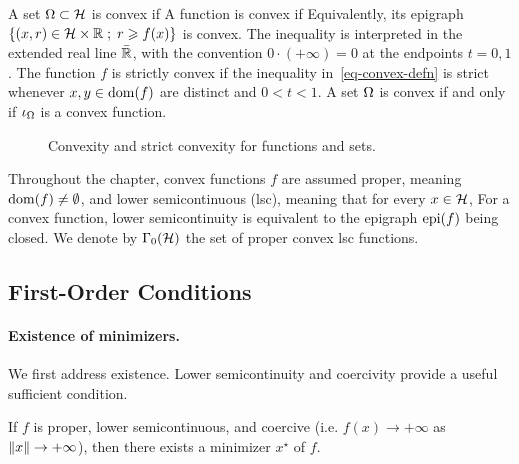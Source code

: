 A set $\Omega \subset \mathcal{H}$ is convex if
A function is convex if
Equivalently, its epigraph $\left\{ (x,r) \in \mathcal{H} \times \mathbb{R} \;;\; r \geqslant f(x) \right\}$ is convex. The inequality is interpreted in the extended real line $\bar{\mathbb{R}}$, with the convention $0\cdot(+\infty)=0$ at the endpoints $t=0,1$.
%
The function $f$ is strictly convex if the inequality in~\eqref{eq-convex-defn} is strict whenever $x,y\in\operatorname{dom}(f)$ are distinct and $0<t<1$.
%
A set $\Omega$ is convex if and only if $\iota_{\Omega}$ is a convex function.



\begin{figure}[tbp]
\centering
{}
\caption{Convexity and strict convexity for functions and sets.}
\label{fig-convex-examples}
\end{figure}




Throughout the chapter, convex functions $f$ are assumed proper, meaning $\operatorname{dom}(f) \neq \emptyset$, and lower semicontinuous (lsc), meaning that for every $x \in \mathcal{H}$,
For a convex function, lower semicontinuity is equivalent to the epigraph $\operatorname{epi}(f)$ being closed.
%
We denote by $\Gamma_0(\mathcal{H})$ the set of proper convex lsc functions.

\subsection{First-Order Conditions}

\paragraph{Existence of minimizers.}

We first address existence. Lower semicontinuity and coercivity provide a useful sufficient condition.

\begin{prop}
	If $f$ is proper, lower semicontinuous, and coercive (i.e. $f(x)\rightarrow +\infty$ as $\lVert x\rVert\rightarrow +\infty$), then there exists a minimizer $x^\star$ of $f$.
\end{prop}

